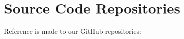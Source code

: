 \chapter{Source Code Repositories}\label{ch:source-code-repositories}

Reference is made to our GitHub repositories:
